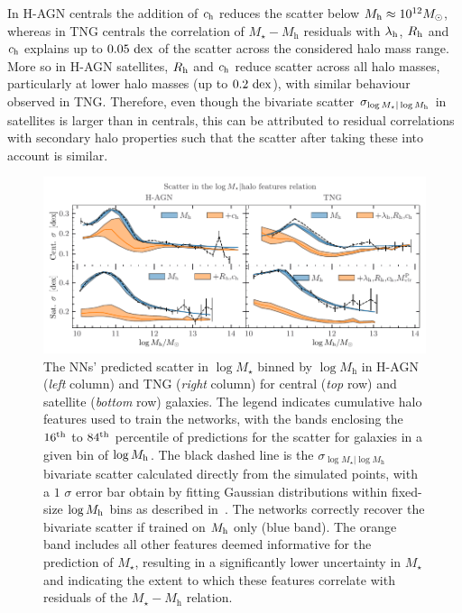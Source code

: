 \documentclass[usenatbib,useAMS]{mnras}
\begin{document}
In H-AGN centrals the addition of $c_{\rm h}$ reduces the scatter below $M_{\rm h}\approx 10^{12} M_\odot$, whereas in TNG centrals the correlation of $M_\star-M_\text{h}$ residuals with $\lambda_{\rm h}$, $R_{\rm h}$ and $c_{\rm h}$ explains up to $0.05~{\rm dex}$ of the scatter across the considered halo mass range. More so in H-AGN satellites, $R_{\rm h}$ and $c_{\rm h}$ reduce scatter across all halo masses, particularly at lower halo masses (up to $0.2~{\rm dex}$), with similar behaviour observed in TNG. Therefore, even though the bivariate scatter $\sigma_{\log M_\star | \log M_{\rm h}}$ in satellites is larger than in centrals, this can be attributed to residual correlations with secondary halo properties such that the scatter after taking these into account is similar.

\begin{figure}
    \centering
    \includegraphics[width=\textwidth]{Figures/NN_scatter_mstar_HAGN.pdf}
    \caption{The \acp{NN}' predicted scatter in $\log M_\star$ binned by $\log M_\mathrm{h}$ in H-AGN (\emph{left} column) and TNG (\emph{right} column) for central (\emph{top} row) and satellite (\emph{bottom} row) galaxies. The legend indicates cumulative halo features used to train the networks, with the bands enclosing the $16^{\rm th}$ to $84^{\rm th}$ percentile of predictions for the scatter for galaxies in a given bin of $\log M_{\rm h}$. The black dashed line is the $\sigma_{\log M_\star | \log M_\mathrm{h}}$ bivariate scatter calculated directly from the simulated points, with a $1$ $\sigma$ error bar obtain by fitting Gaussian distributions within fixed-size $\log M_{\rm h}$ bins as described in~. The networks correctly recover the bivariate scatter if trained on $M_{\rm h}$ only (blue band). The orange band includes all other features deemed informative for the prediction of $M_\star$, resulting in a significantly lower uncertainty in $M_\star$ and indicating the extent to which these features correlate with residuals of the $M_\star-M_\mathrm{h}$ relation.
    }
    \label{fig:NNscatter_Mstar}
\end{figure}
\end{document}
